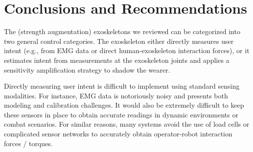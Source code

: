 \documentclass[letterpaper,12pt,fullpage]{article}
\begin{document}
%

















\section{Conclusions and Recommendations}
\label{survey:recommend}

The (strength augmentation) exoskeletons we reviewed can be categorized into two general control categories.  The exoskeleton either directly measures user intent (e.g., from EMG data or direct human-exoskeleton interaction forces), or it estimates intent from measurements at the exoskeleton joints and applies a sensitivity amplification strategy to shadow the wearer.  

Directly measuring user intent is difficult to implement using standard sensing modalities.  For instance, EMG data is notoriously noisy and presents both modeling and calibration challenges.  It would also be extremely difficult to keep these sensors in place to obtain accurate readings in dynamic environments or combat scenarios.  For similar reasons, many systems avoid the use of load cells or complicated sensor networks to accurately obtain operator-robot interaction forces / torques.  
\end{document}
